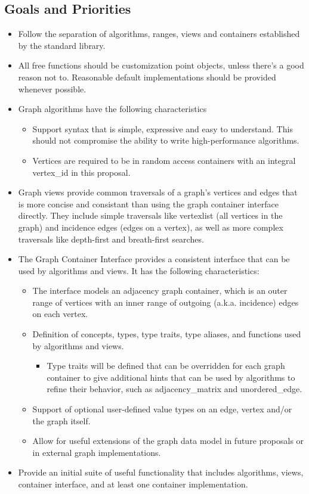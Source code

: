\documentclass[10pt,onecolumn]{article}
\begin{document}
\subsection{Goals and Priorities}
\begin{itemize}
\item Follow the separation of algorithms, ranges, views and containers established by the standard library.
\item All free functions should be customization point objects, unless there's a good reason not to. Reasonable default implementations should be provided whenever possible.
\item Graph algorithms have the following characteristics
\begin{itemize}
\item Support syntax that is simple, expressive and easy to understand. This should not compromise the ability to write high-performance algorithms.
\item Vertices are required to be in random access containers with an integral vertex\_id in this proposal.
\end{itemize}
\item Graph views provide common traversals of a graph's vertices and edges that is more concise and consistant than using the graph container interface directly. They include simple traversals like vertexlist (all vertices in the graph) and incidence edges (edges on a vertex), as well as more complex traversals like depth-first and breath-first searches.
\item The Graph Container Interface provides a consistent interface that can be used by algorithms and views. It has the following characteristics:
\begin{itemize}
\item The interface models an adjacency graph container, which is an outer range of vertices with an inner range of outgoing (a.k.a. incidence) edges on each vertex. 
\item Definition of concepts, types, type traits, type aliases, and functions used by algorithms and views.
\begin{itemize}
\item Type traits will be defined that can be overridden for each graph container to give additional hints that can be used by algorithms to refine their behavior, such as adjacency\_matrix and unordered\_edge.
\end{itemize}
\item Support of optional user-defined value types on an edge, vertex and/or the graph itself.
\item Allow for useful extensions of the graph data model in future proposals or in external graph implementations. 
\end{itemize}
\item Provide an initial suite of useful functionality that includes algorithms, views, container interface, and at least one container implementation.
\end{itemize}
\end{document}
